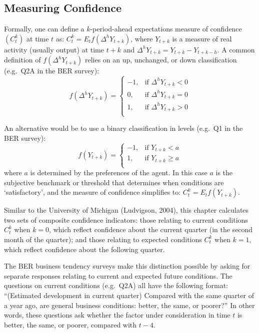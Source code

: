 \documentclass[11pt,]{article}
\begin{document}
\subsection{Measuring Confidence}\label{measuring-confidence-1}

Formally, one can define a \(k\)-period-ahead expectations measure of
confidence \((C_t^k)\) at time \(t\) as:
\(C _t^k = E_t f(\Delta^h Y_{t+k})\), where \(Y_{t+k}\) is a measure of
real activity (usually output) at time \(t+k\) and
\(\Delta^h Y_{t+k} = Y_{t+k} - Y_{t+k-h}\). A common definition of
\(f(\Delta^h Y_{t+k})\) relies on an up, unchanged, or down
classification (e.g.~Q2A in the BER survey):
\[ f(\Delta^h Y_{t+k}) = \begin{cases} -1,& \text{if } \Delta^h Y_{t+k} < 0\\ 0,& \text{if } \Delta^h Y_{t+k} = 0\\ 1,& \text{if } \Delta^h Y_{t+k} > 0\\ \end{cases} \]

An alternative would be to use a binary classification in levels
(e.g.~Q1 in the BER survey):
\[ f(Y_{t+k}) = \begin{cases} -1,& \text{if } Y_{t+k} < a\\ 1,& \text{if } Y_{t+k} \geq a\\ \end{cases}\]
where \(a\) is determined by the preferences of the agent. In this case
\(a\) is the subjective benchmark or threshold that determines when
conditions are `satisfactory', and the measure of confidence simplifies
to: \(C _t^k = E_t f(Y_{t+k})\).

Similar to the University of Michigan (Ludvigson, 2004), this chapter
calculates two sets of composite confidence indicators: those relating
to current conditions \(C_t^k\) when \(k=0\), which reflect confidence
about the current quarter (in the second month of the quarter); and
those relating to expected conditions \(C_t^k\) when \(k=1\), which
reflect confidence about the following quarter.

The BER business tendency surveys make this distinction possible by
asking for separate responses relating to current and expected future
conditions. The questions on current conditions (e.g.~Q2A) all have the
following format: ``(Estimated development in current quarter) Compared
with the same quarter of a year ago, are general business conditions:
better, the same, or poorer?'' In other words, these questions ask
whether the factor under consideration in time \(t\) is better, the
same, or poorer, compared with \(t-4\).
\end{document}
